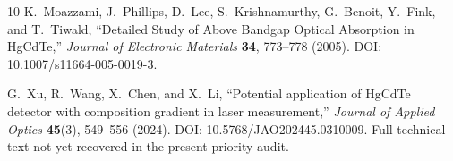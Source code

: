 \documentclass[11pt]{article}
\begin{document}
\begin{thebibliography}{10}
K.~Moazzami, J.~Phillips, D.~Lee, S.~Krishnamurthy, G.~Benoit, Y.~Fink, and T.~Tiwald, ``Detailed Study of Above Bandgap Optical Absorption in HgCdTe,'' \emph{Journal of Electronic Materials} \textbf{34}, 773--778 (2005). DOI: 10.1007/s11664-005-0019-3.

G.~Xu, R.~Wang, X.~Chen, and X.~Li, ``Potential application of HgCdTe detector with composition gradient in laser measurement,'' \emph{Journal of Applied Optics} \textbf{45}(3), 549--556 (2024). DOI: 10.5768/JAO202445.0310009. Full technical text not yet recovered in the present priority audit.

\end{thebibliography}
\end{document}
